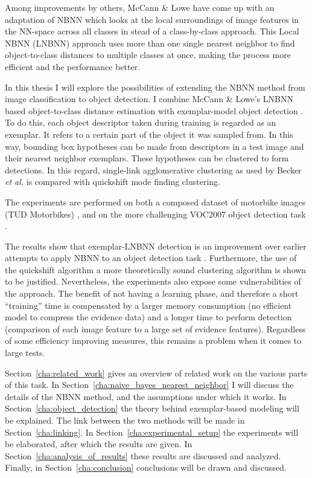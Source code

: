 Among improvements by others, McCann \& Lowe \cite{mccann2012local} have come up with an adaptation of NBNN which looks at the local surroundings of image features in the NN-space across all classes in stead of a class-by-class approach. This Local NBNN (LNBNN) approach uses more than one single nearest neighbor to find object-to-class distances to multiple classes at once, making the process more efficient and the performance better. 

In this thesis I will explore the possibilities of extending the NBNN method from image classification to object detection. I combine McCann \& Lowe's LNBNN based object-to-class distance estimation with exemplar-model object detection \cite{becker2012codebook, chum2007exemplar}. To do this, each object descriptor taken during training is regarded as an exemplar. It refers to a certain part of the object it was sampled from. In this way, bounding box hypotheses can be made from descriptors in a test image and their nearest neighbor exemplars. These hypotheses can be clustered to form detections. In this regard, single-link agglomerative clustering as used by Becker \emph{et al.} \cite{becker2012codebook} is compared with quickshift mode finding clustering. 

The experiments are performed on both a composed dataset of motorbike images (TUD Motorbikes) \cite{becker2012codebook, fritz2005integrating}, and on the more challenging VOC2007 object detection task \cite{pascal-voc-2007}.

The results show that exemplar-LNBNN detection is an improvement over earlier attempts to apply NBNN to an object detection task \cite{becker2012codebook}. Furthermore, the use of the quickshift algorithm a more theoretically sound clustering algorithm is shown to be justified. Nevertheless, the experiments also expose some vulnerabilities of the approach. The benefit of not having a learning phase, and therefore a short ``training'' time is compensated by a larger memory consumption (no efficient model to compress the evidence data) and a longer time to perform detection (comparison of each image feature to a large set of evidence features). Regardless of some efficiency improving measures, this remains a problem when it comes to large tests.

Section~\ref{cha:related_work} gives an overview of related work on the various parts of this task. In Section~\ref{cha:naive_bayes_nearest_neighbor} I will discuss the details of the NBNN method, and the assumptions under which it works. In Section~\ref{cha:object_detection} the theory behind exemplar-based modeling will be explained. The link between the two methods will be made in Section~\ref{cha:linking}. In Section~\ref{cha:experimental_setup} the experiments will be elaborated, after which the results are given. In Section~\ref{cha:analysis_of_results} these results are discussed and analyzed. Finally, in Section~\ref{cha:conclusion} conclusions will be drawn and discussed.

